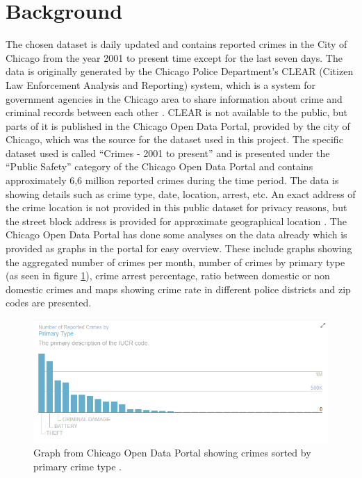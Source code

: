
\section{Background}

The chosen dataset is daily updated and contains reported crimes in the City of Chicago from the year 2001 to present time except for the last seven days. The data is originally generated by the Chicago Police Department’s CLEAR (Citizen Law Enforcement Analysis and Reporting) system, which is a system for government agencies in the Chicago area to share information about crime and criminal records between each other \cite{CLEARpolice}. CLEAR is not available to the public, but parts of it is published in the Chicago Open Data Portal, provided by the city of Chicago, which was the source for the dataset used in this project. 
\bigbreak
The specific dataset used is called “Crimes - 2001 to present” and is presented under the “Public Safety” category of the Chicago Open Data Portal and contains approximately 6,6 million reported crimes during the time period. The data is showing details such as crime type, date, location, arrest, etc. An exact address of the crime location is not provided in this public dataset for privacy reasons, but the street block address is provided for approximate geographical location \cite{cityOfChicago}. 
\bigbreak
The Chicago Open Data Portal has done some analyses on the data already which is provided as graphs in the portal for easy overview. These include graphs showing the aggregated number of crimes per month, number of crimes by primary type (as seen in figure \ref{fig:exampleGraph}), crime arrest percentage, ratio between domestic or non domestic crimes and maps showing crime rate in different police districts and zip codes are presented. 

\begin{figure}[H]
    \centering
    \includegraphics[width=.95\linewidth]{figures/existingPrimaryType.PNG}
    \caption{Graph from Chicago Open Data Portal showing crimes sorted by primary crime type \cite{cityOfChicago}.}
    \label{fig:exampleGraph}
\end{figure}

\pagebreak